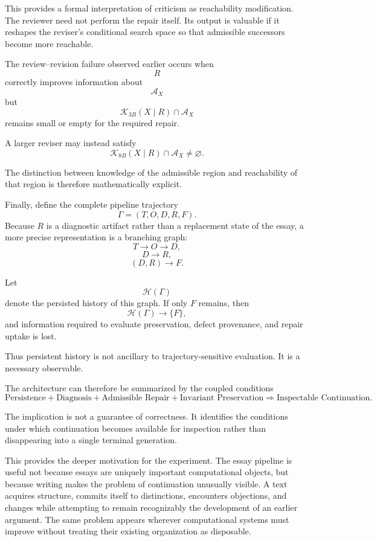 \documentclass[11pt]{article}
\begin{document}
This provides a formal interpretation of criticism as reachability modification. The reviewer need not perform the repair itself. Its output is valuable if it reshapes the reviser's conditional search space so that admissible successors become more reachable.

The review--revision failure observed earlier occurs when
\[
    R
\]
correctly improves information about
\[
    \mathcal{A}_X
\]
but
\[
    \mathcal{K}_{3B}(X\mid R)
        \cap
    \mathcal{A}_X
\]
remains small or empty for the required repair.

A larger reviser may instead satisfy
\[
    \mathcal{K}_{8B}(X\mid R)
        \cap
    \mathcal{A}_X
    \neq\varnothing.
\]

The distinction between knowledge of the admissible region and reachability of that region is therefore mathematically explicit.

Finally, define the complete pipeline trajectory
\[
    \Gamma
    =
    \left(
        T,O,D,R,F
    \right).
\]
Because \(R\) is a diagnostic artifact rather than a replacement state of the essay, a more precise representation is a branching graph:
\[
    T\rightarrow O\rightarrow D,
\]
\[
    D\rightarrow R,
\]
\[
    (D,R)\rightarrow F.
\]

Let
\[
    \mathcal{H}(\Gamma)
\]
denote the persisted history of this graph. If only \(F\) remains, then
\[
    \mathcal{H}(\Gamma)
    \rightarrow
    \{F\},
\]
and information required to evaluate preservation, defect provenance, and repair uptake is lost.

Thus persistent history is not ancillary to trajectory-sensitive evaluation. It is a necessary observable.

The architecture can therefore be summarized by the coupled conditions
\[
    \text{Persistence}
    +
    \text{Diagnosis}
    +
    \text{Admissible Repair}
    +
    \text{Invariant Preservation}
    \Longrightarrow
    \text{Inspectable Continuation}.
\]

The implication is not a guarantee of correctness. It identifies the conditions under which continuation becomes available for inspection rather than disappearing into a single terminal generation.

This provides the deeper motivation for the experiment. The essay pipeline is useful not because essays are uniquely important computational objects, but because writing makes the problem of continuation unusually visible. A text acquires structure, commits itself to distinctions, encounters objections, and changes while attempting to remain recognizably the development of an earlier argument. The same problem appears wherever computational systems must improve without treating their existing organization as disposable.
\end{document}
